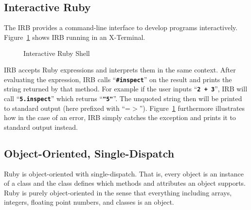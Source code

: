 \documentclass[12pt,a4paper,oneside,openright]{book}
\newcommand{\Eg}{For ex\-am\-ple }
\newcommand{\Ie}{That is, }
\newcommand{\fig}[1]{Figure~\ref{fig:#1}}
\newcommand{\lst}[1]{Listing~\ref{lst:#1}}
\newcommand{\code}[1]{``\texttt{\textbf{\textcolor{codegray}{\small{#1}}}}''}
\begin{document}
\begin{CJK}{UTF8}{}
\subsection{Interactive Ruby}\label{cha:irb}
The \ac{IRB} provides a command-line interface to develop programs interactively. \fig{irb} shows \ac{IRB} running in an X-Terminal.
\begin{figure}[htbp]
  \begin{center}
    \caption{Interactive Ruby Shell\label{fig:irb}}
  \end{center}
\end{figure}
\ac{IRB} accepts Ruby expressions and interprets them in the same context. After evaluating the expression, \ac{IRB} calls \code{\#inspect} on the result and prints the string returned by that method. \Eg if the user inputs \code{2 + 3}, \ac{IRB} will call \code{5.inspect} which returns \code{"5"}. The unquoted string then will be printed to standard output (here prefixed with ``=$>$''). \fig{irb} furthermore illustrates how in the case of an error, \ac{IRB} simply catches the exception and prints it to standard output instead.

\subsection{Object-Oriented, Single-Dispatch}
Ruby is object-oriented with single-dispatch. \Ie every object is an instance of a class and the class defines which methods and attributes an object supports. Ruby is purely object-oriented in the sense that everything including arrays, integers, floating point numbers, and classes is an object.


\end{CJK}
\end{document}
